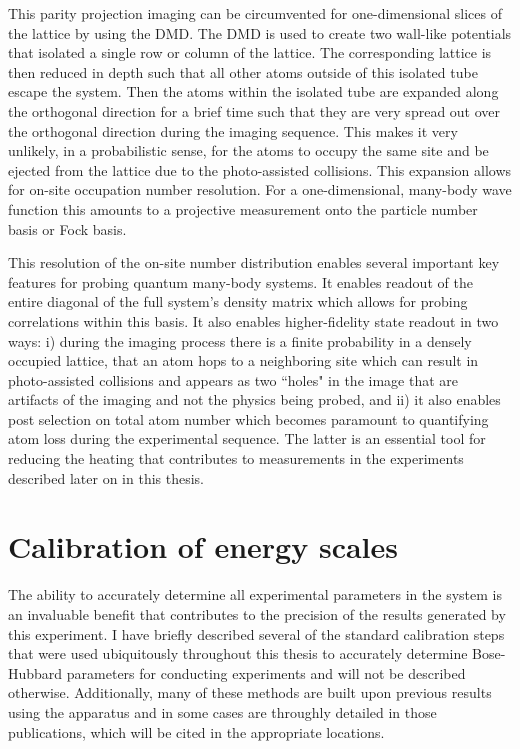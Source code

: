 This parity projection imaging can be circumvented for one-dimensional slices of the lattice by using the DMD. The DMD is used to create two wall-like potentials that isolated a single row or column of the lattice. The corresponding lattice is then reduced in depth such that all other atoms outside of this isolated tube escape the system. Then the atoms within the isolated tube are expanded along the orthogonal direction for a brief time such that they are very spread out over the orthogonal direction during the imaging sequence\cite{Kaufman2016}. This makes it very unlikely, in a probabilistic sense, for the atoms to occupy the same site and be ejected from the lattice due to the photo-assisted collisions. This expansion allows for on-site occupation number resolution. For a one-dimensional, many-body wave function this amounts to a projective measurement onto the particle number basis or Fock basis. 

This resolution of the on-site number distribution enables several important key features for probing quantum many-body systems. It enables readout of the entire diagonal of the full system's density matrix which allows for probing correlations within this basis. It also enables higher-fidelity state readout in two ways: i) during the imaging process there is a finite probability in a densely occupied lattice, that an atom hops to a neighboring site which can result in photo-assisted collisions and appears as two ``holes" in the image that are artifacts of the imaging and not the physics being probed, and ii) it also enables post selection on total atom number which becomes paramount to quantifying atom loss during the experimental sequence. The latter is an essential tool for reducing the heating that contributes to measurements in the experiments described later on in this thesis.

\section{Calibration of energy scales}

The ability to accurately determine all experimental parameters in the system is an invaluable benefit that contributes to the precision of the results generated by this experiment. I have briefly described several of the standard calibration steps that were used ubiquitously throughout this thesis to accurately determine Bose-Hubbard parameters for conducting experiments and will not be described otherwise. Additionally, many of these methods are built upon previous results using the apparatus and in some cases are throughly detailed in those publications, which will be cited in the appropriate locations.

